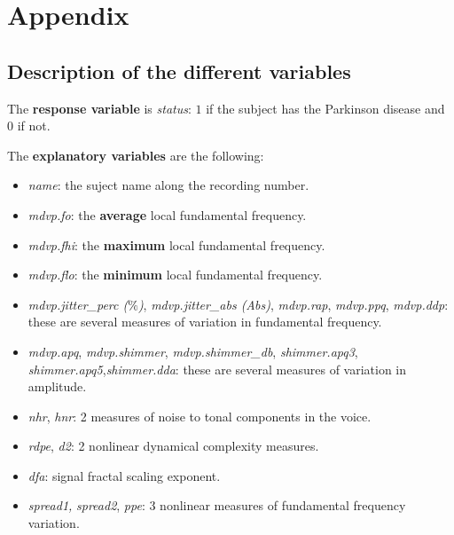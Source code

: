 \section*{Appendix}

\subsection*{Description of the different variables}

The \textbf{response variable} is \textit{status}: $1$ if the subject has the Parkinson disease and $0$ if not.

The \textbf{explanatory variables} are the following:

\begin{itemize}
	\item \textit{name}: the suject name along the recording number.
	\item \textit{mdvp.fo}: the \textbf{average} local fundamental frequency.
	\item \textit{mdvp.fhi}: the \textbf{maximum} local fundamental frequency.
	\item \textit{mdvp.flo}: the \textbf{minimum} local fundamental frequency.
	\item \textit{mdvp.jitter\_perc ($\%$)}, \textit{mdvp.jitter\_abs (Abs)}, \textit{mdvp.rap}, \textit{mdvp.ppq}, \textit{mdvp.ddp}: these are several measures of variation in fundamental frequency.
	\item \textit{mdvp.apq}, \textit{mdvp.shimmer}, \textit{mdvp.shimmer\_db}, \textit{shimmer.apq3}, \textit{shimmer.apq5},\textit{shimmer.dda}: these are several measures of variation in amplitude.
	\item \textit{nhr}, \textit{hnr}: 2 measures of noise to tonal components in the voice.
	\item \textit{rdpe}, \textit{d2}: 2 nonlinear dynamical complexity measures.
	\item \textit{dfa}: signal fractal scaling exponent.
	\item \textit{spread1,} \textit{spread2}, \textit{ppe}: 3 nonlinear measures of fundamental frequency variation.
\end{itemize}

